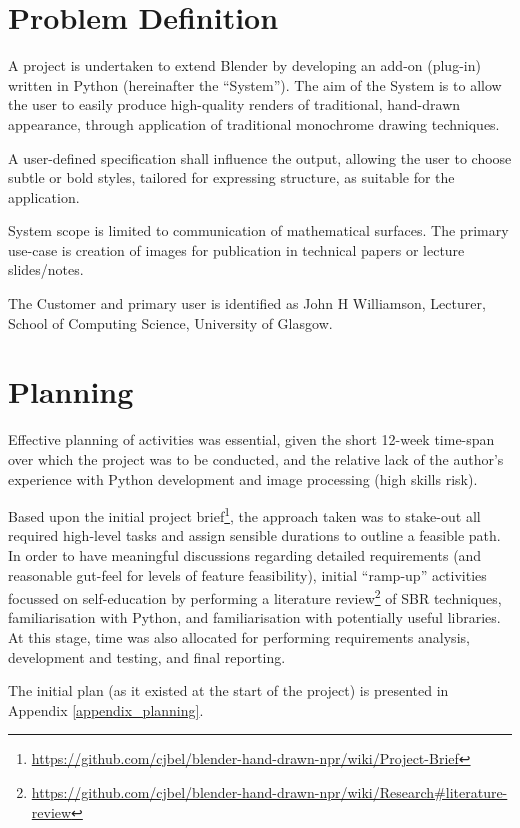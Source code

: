 \section{Problem Definition}

A project is undertaken to extend Blender by developing an add-on (plug-in) written in Python (hereinafter the ``System''). The aim of the System is to allow the user to easily produce high-quality renders of traditional, hand-drawn appearance, through application of traditional monochrome drawing techniques.

A user-defined specification shall influence the output, allowing the user to choose subtle or bold styles, tailored for expressing structure, as suitable for the application.

System scope is limited to communication of mathematical surfaces. The primary use-case is creation of images for publication in technical papers or lecture slides/notes.

The Customer and primary user is identified as John H Williamson, Lecturer, School of Computing Science, University of Glasgow.

\section{Planning}

Effective planning of activities was essential, given the short 12-week time-span over which the project was to be conducted, and the relative lack of the author's experience with Python development and image processing (high skills risk).

Based upon the initial project brief\footnote{\url{https://github.com/cjbel/blender-hand-drawn-npr/wiki/Project-Brief}}, the approach taken was to stake-out all required high-level tasks and assign sensible durations to outline a feasible path. 
In order to have meaningful discussions regarding detailed requirements (and reasonable gut-feel for levels of feature feasibility), initial ``ramp-up'' activities focussed on self-education by performing a literature review\footnote{\url{https://github.com/cjbel/blender-hand-drawn-npr/wiki/Research#literature-review}} of SBR techniques, familiarisation with Python, and familiarisation with potentially useful libraries.
At this stage, time was also allocated for performing requirements analysis, development and testing, and final reporting.

The initial plan (as it existed at the start of the project) is presented in Appendix \ref{appendix_planning}.

